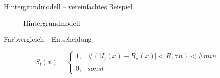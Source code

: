 \documentclass[hyperref={pdfpagelabels=false}]{beamer}
\begin{document}
\begin{frame}[t]{Hintergrundmodell -- vereinfachtes Beispiel}
\begin{figure}
\begin{minipage}{0.45\linewidth}
			\caption*{Hintergrundmodell}
		\end{minipage}
	\end{figure}
\end{frame}


\begin{frame}[t]{Farbvergleich -- Entscheidung }
	\bigskip
	\bigskip
	\bigskip


	\begin{equation*}
		S_t(x)= \left\{
				\begin{array}{ll} 
					1, &  \# (|I_t(x) - B_n(x)| < R, \forall n) < \# min\\
					\\
					0, & sonst
				\end{array}
			\right .
	\end{equation*}
\end{frame}
\end{document}
